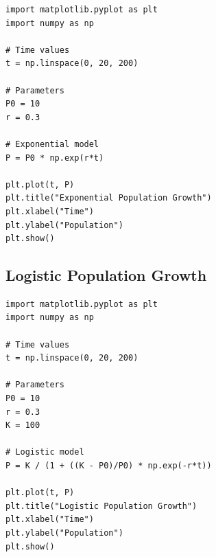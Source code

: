 \documentclass{article}
\begin{document}
\begin{lstlisting}[caption={Exponential Growth Model}]
import matplotlib.pyplot as plt
import numpy as np

# Time values
t = np.linspace(0, 20, 200)

# Parameters
P0 = 10
r = 0.3

# Exponential model
P = P0 * np.exp(r*t)

plt.plot(t, P)
plt.title("Exponential Population Growth")
plt.xlabel("Time")
plt.ylabel("Population")
plt.show()
\end{lstlisting}


\subsection{Logistic Population Growth}

\begin{lstlisting}[caption={Logistic Growth Model}]
import matplotlib.pyplot as plt
import numpy as np

# Time values
t = np.linspace(0, 20, 200)

# Parameters
P0 = 10
r = 0.3
K = 100

# Logistic model
P = K / (1 + ((K - P0)/P0) * np.exp(-r*t))

plt.plot(t, P)
plt.title("Logistic Population Growth")
plt.xlabel("Time")
plt.ylabel("Population")
plt.show()
\end{lstlisting}
\end{document}
